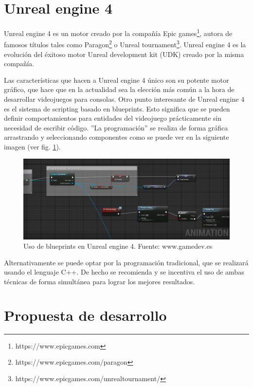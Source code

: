 \section{Unreal engine 4}

Unreal engine 4 es un motor creado por la compañía Epic games\footnote{https://www.epicgames.com}, autora de famosos títulos tales como Paragon\footnote{https://www.epicgames.com/paragon} o Unreal tournament\footnote{https://www.epicgames.com/unrealtournament/}. 
Unreal engine 4 es la evolución del éxitoso motor Unreal development kit (UDK) creado por la misma compañía.


Las características que hacen a Unreal engine 4 único son su potente motor gráfico, que hace que en la actualidad sea la elección más común a la hora de desarrollar videojuegos para consolas. Otro punto interesante de Unreal engine 4 es el sistema de scripting basado en blueprints. Esto significa que se pueden definir comportamientos para entidades del videojuego prácticamente sin necesidad de escribir código. ''La programación'' se realiza de forma gráfica arrastrando y seleccionando componentes como se puede ver en la siguiente imagen (ver fig. \ref{blueprints}).

\begin{figure}
\begin{center}
\includegraphics[scale=0.4]{imagenes/blueprints.png}
\caption{Uso de blueprints en Unreal engine 4. Fuente: www.gamedev.es}
\label{blueprints}
\end{center}
\end{figure}

Alternativamente se puede optar por la programación tradicional, que se realizará usando el lenguaje C++. De hecho se recomienda y se incentiva el uso de ambas técnicas de forma simultánea para lograr los mejores resultados.

\section{Propuesta de desarrollo}

